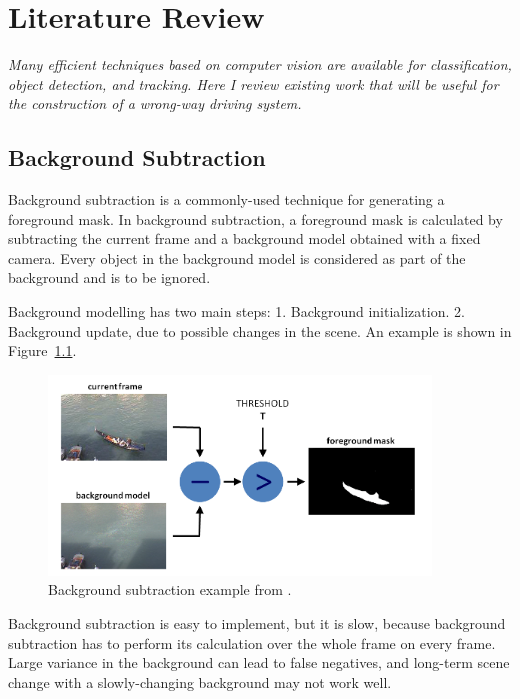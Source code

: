 \setlength{\footskip}{8mm}

\chapter{Literature Review} 
\label{ch:literature-review}

\textit{Many efficient techniques based on computer vision are available for classification, object detection, and tracking. Here I review existing work that will be useful for the construction of a wrong-way driving system.}

\section{Background Subtraction }
\label{Background Subtraction}
Background subtraction is a commonly-used technique for generating a foreground mask. In background subtraction, a foreground mask is calculated by subtracting the current frame and a background model obtained with a fixed camera. Every object in the background model is considered as part of the background and is to be ignored.

Background modelling has two main steps:\newline
\tab \hspace{8mm}1. Background initialization.\newline
\tab \hspace{8mm}2. Background update, due to possible changes in the scene.\newline
An example is shown in Figure~\ref{fig:background}.

\begin{figure}[t]
  \centering
  \includegraphics[width=4in]{figures/background.jpg}  
  \caption[Background Subtraction]{Background subtraction example from .}
  \label{fig:background}
\end{figure}

Background subtraction is easy to implement, but it is slow, because background subtraction has to perform its calculation over the whole frame on every frame. Large variance in the background can lead to false negatives, and long-term scene change with a slowly-changing background may not work well.



